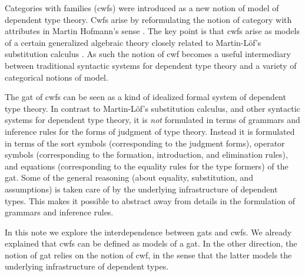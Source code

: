 \documentclass{lmcs}
\def\Cwf{\mathbf{CwF}}
\begin{document}
Categories with families (cwfs) \cite{dybjer:torino} were introduced as a new notion of model of dependent type theory. Cwfs arise by reformulating the notion of category with attributes in Martin Hofmann's sense \cite{hofmann:csl}. The key point is that cwfs arise as models of a certain generalized algebraic theory closely related to Martin-Löf's substitution calculus \cite{martinlof:gbg92}. As such the notion of cwf becomes a useful intermediary between traditional syntactic systems for dependent type theory and a variety of categorical notions of model.

The gat of cwfs can be seen as a kind of idealized formal system of dependent type theory. In contrast to Martin-Löf's substitution calculus, and other syntactic systems for dependent type theory, it is {\em not} formulated in terms of grammars and inference rules for the forms of judgment of type theory. Instead it is formulated in terms of the sort symbols (corresponding to the judgment forms), operator symbols (corresponding to the formation, introduction, and elimination rules), and equations (corresponding to the equality rules for the type formers) of the gat. Some of the general reasoning (about equality, substitution, and assumptions) is taken care of by the underlying infrastructure of dependent types. This makes it possible to abstract away from details in the formulation of grammars and inference rules.

In this note we explore the interdependence between gats and cwfs. We already explained that cwfs can be defined as models of a gat.
In the other direction, the notion of gat relies on the notion of cwf, in the sense that the latter models the underlying infrastructure of dependent types.

\end{document}
